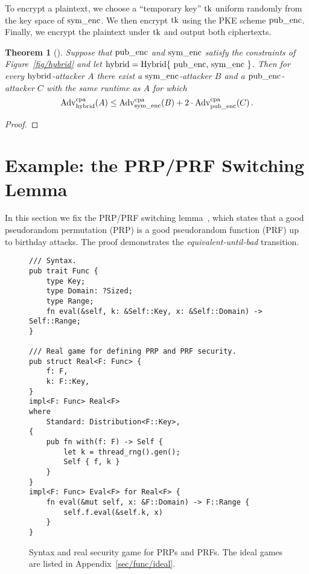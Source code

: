 \documentclass{article}
\newtheorem{theorem}{Theorem}
\newcommand{\Adv}[1]{\textrm{\textup{Adv}}^{\textup{#1}}}
\newcommand{\code}[1]{\textrm{\textup{\lstinline{#1}}}}
\begin{document}
To encrypt a plaintext, we choose a ``temporary key'' $\code{tk}$ uniform
randomly from the key space of $\code{sym_enc}$.
%
We then encrypt $\code{tk}$ using the PKE scheme $\code{pub_enc}$.
%
Finally, we encrypt the plaintext under $\code{tk}$ and output both
ciphertexts.

\begin{theorem}[{\cite[Claim~15.9]{joy}}]\label{thm/hybrid}
  Suppose that $\code{pub_enc}$ and $\code{sym_enc}$ satisfy the constraints of
  Figure~\ref{fig/hybrid} and let $\code{hybrid} = \code{Hybrid\{
    pub_enc, sym_enc \}}$.
  Then for every $\code{hybrid}$-attacker $A$ there exist a
  $\code{sym_enc}$-attacker $B$ and a $\code{pub_enc}$-attacker $C$ with
  the same runtime as $A$ for which
  \[
    \Adv{cpa}_\code{hybrid}(A) \leq
      \Adv{cpa}_\code{sym_enc}(B) +
      2\cdot\Adv{cpa}_\code{pub_enc}(C) \,.
  \]
\end{theorem}

\begin{proof}
  
\end{proof}


\section{Example: the PRP/PRF Switching Lemma}\label{sec/switching}

In this section we fix the PRP/PRF switching lemma~\cite{BR06}, which states
that a good pseudorandom permutation (PRP) is a good pseudorandom function
(PRF) up to birthday attacks.
%
The proof demonstrates the \emph{equivalent-until-bad} transition.

\begin{figure}[t]
\begin{lstlisting}
/// Syntax.
pub trait Func {
    type Key;
    type Domain: ?Sized;
    type Range;
    fn eval(&self, k: &Self::Key, x: &Self::Domain) -> Self::Range;
}

/// Real game for defining PRP and PRF security.
pub struct Real<F: Func> {
    f: F,
    k: F::Key,
}
impl<F: Func> Real<F>
where
    Standard: Distribution<F::Key>,
{
    pub fn with(f: F) -> Self {
        let k = thread_rng().gen();
        Self { f, k }
    }
}
impl<F: Func> Eval<F> for Real<F> {
    fn eval(&mut self, x: &F::Domain) -> F::Range {
        self.f.eval(&self.k, x)
    }
}
\end{lstlisting}
  \caption{Syntax and real security game for PRPs and PRFs. The ideal games are
  listed in Appendix~\ref{sec/func/ideal}.}
  \label{fig/func/syntax}
  \label{fig/func/real}
\end{figure}
\end{document}
